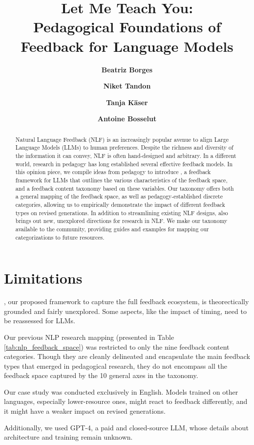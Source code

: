 \documentclass[11pt]{article}
\title{Let Me Teach You: \\ Pedagogical Foundations of Feedback for Language Models}
\author[1]{\textbf{Beatriz Borges}}
\author[2]{\textbf{Niket Tandon}}
\author[1]{\textbf{Tanja Käser}}
\author[1]{\textbf{Antoine Bosselut}}
\affil{EPFL \:\:\: $^2$Allen Institute for Artificial Intelligence}
\affil[ ]{\texttt{\{beatriz.borges, antoine.bosselut\}@epfl.ch}}
\begin{document}
\maketitle
\begin{abstract}
Natural Language Feedback (NLF) is an increasingly popular avenue to align Large Language Models (LLMs) to human preferences. Despite the richness and diversity of the information it can convey, NLF is often hand-designed and arbitrary. In a different world, research in pedagogy has long established several effective feedback models. 
In this opinion piece, we compile ideas from pedagogy to introduce \ours, a feedback framework for LLMs that outlines the various characteristics of the feedback space, and a feedback content taxonomy based on these variables. 
Our taxonomy offers both a general mapping of the feedback space, as well as pedagogy-established discrete categories, allowing us to empirically demonstrate the impact of different feedback types on revised generations. In addition to streamlining existing NLF designs, \ours also brings out new, unexplored directions for research in NLF. We make our taxonomy available to the community, providing guides and examples for mapping our categorizations to future resources.
\end{abstract}








\newpage
\section*{Limitations}
\ours, our proposed framework to capture the full feedback ecosystem, is theorectically grounded and fairly unexplored. Some aspects, like the impact of timing, need to be reassessed for LLMs.

Our previous NLP research mapping (presented in Table \ref{tab:nlp_feedback_space}) was restricted to only the nine feedback content categories. Though they are cleanly delineated and encapsulate the main feedback types that emerged in pedagogical research, they do not encompass all the feedback space captured by the 10 general axes in the taxonomy.

Our case study was conducted exclusively in English. Models trained on other languages, especially lower-resource ones, might react to feedback differently, and it might have a weaker impact on revised generations. 

Additionally, we used GPT-4, a paid and closed-source LLM, whose details about architecture and training remain unknown.






\appendix




\end{document}
